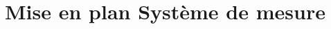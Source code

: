 \section[Mise en plan Système de mesure]{Mise en plan Système de mesure}\label{mise_en_plan_systeme_mesure}

\begin{figure}[H]
    \centering
    
\end{figure}